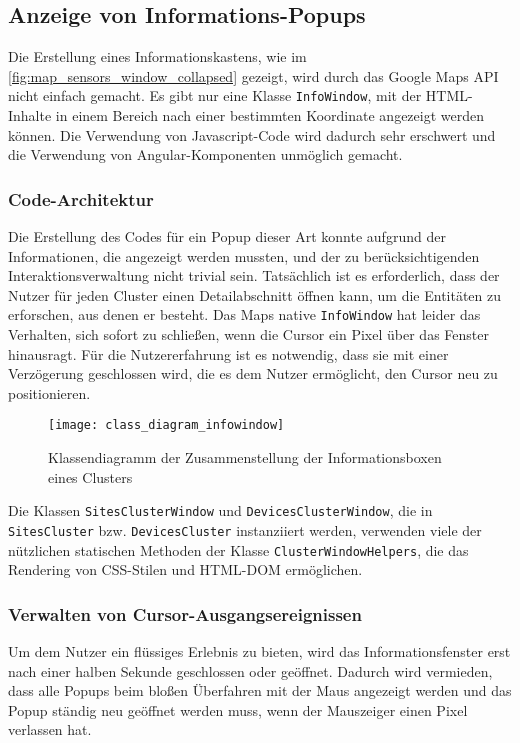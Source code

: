 \subsection{Anzeige von Informations-Popups}

Die Erstellung eines Informationskastens, wie im \ref{fig:map_sensors_window_collapsed} gezeigt, wird durch das Google Maps API nicht einfach gemacht.
Es gibt nur eine Klasse \lstinline{InfoWindow}, mit der HTML-Inhalte in einem Bereich nach einer bestimmten Koordinate angezeigt werden können.
Die Verwendung von Javascript-Code wird dadurch sehr erschwert und die Verwendung von Angular-Komponenten unmöglich gemacht.

\subsubsection{Code-Architektur}

Die Erstellung des Codes für ein Popup dieser Art konnte aufgrund der Informationen, die angezeigt werden mussten, und der zu berücksichtigenden Interaktionsverwaltung nicht trivial sein.
Tatsächlich ist es erforderlich, dass der Nutzer für jeden Cluster einen Detailabschnitt öffnen kann, um die Entitäten zu erforschen, aus denen er besteht.
Das Maps native \lstinline{InfoWindow} hat leider das Verhalten, sich sofort zu schließen, wenn die Cursor ein Pixel über das Fenster hinausragt.
Für die Nutzererfahrung ist es notwendig, dass sie mit einer Verzögerung geschlossen wird, die es dem Nutzer ermöglicht, den Cursor neu zu positionieren.

\begin{figure}[H]
  \centering
  \texttt{[image: class\_diagram\_infowindow]}
  \caption{Klassendiagramm der Zusammenstellung der Informationsboxen eines Clusters}
  \label{fig:class_diagram_infowindow}
\end{figure}

Die Klassen \lstinline{SitesClusterWindow} und \lstinline{DevicesClusterWindow}, die in \lstinline{SitesCluster} bzw. \lstinline{DevicesCluster} instanziiert werden, verwenden viele der nützlichen statischen Methoden der Klasse \lstinline{ClusterWindowHelpers}, die das Rendering von CSS-Stilen und HTML-DOM ermöglichen.

\subsubsection{Verwalten von Cursor-Ausgangsereignissen}

Um dem Nutzer ein flüssiges Erlebnis zu bieten, wird das Informationsfenster erst nach einer halben Sekunde geschlossen oder geöffnet.
Dadurch wird vermieden, dass alle Popups beim bloßen Überfahren mit der Maus angezeigt werden und das Popup ständig neu geöffnet werden muss, wenn der Mauszeiger einen Pixel verlassen hat.

